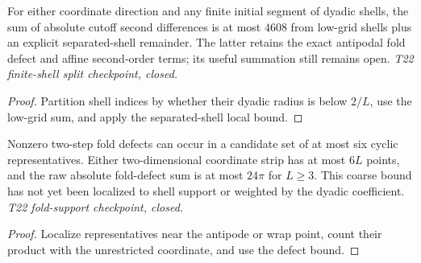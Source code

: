 \begin{lemma}
  \label{lem:normalized-cutoff-shell-split-sum}
  \leanok
  For either coordinate direction and any finite initial segment of
  dyadic shells, the sum of absolute cutoff second differences is at
  most $4608$ from low-grid shells plus an explicit separated-shell
  remainder. The latter retains the exact antipodal fold defect and
  affine second-order terms; its useful summation still remains open.
  \emph{T22 finite-shell split checkpoint, closed.}
\end{lemma}
\begin{proof}\leanok
  Partition shell indices by whether their dyadic radius is below
  $2/L$, use the low-grid sum, and apply the separated-shell local bound.
\end{proof}

\begin{lemma}
  \label{lem:normalized-cutoff-fold-support}
  \leanok
  Nonzero two-step fold defects can occur in a candidate set of at most
  six cyclic representatives. Either two-dimensional coordinate strip
  has at most $6L$ points, and the raw absolute fold-defect sum is at
  most $24\pi$ for $L\geq3$. This coarse bound has not yet been
  localized to shell support or weighted by the dyadic coefficient.
  \emph{T22 fold-support checkpoint, closed.}
\end{lemma}
\begin{proof}\leanok
  Localize representatives near the antipode or wrap point, count
  their product with the unrestricted coordinate, and use the defect bound.
\end{proof}

